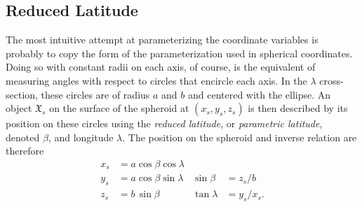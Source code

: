 \documentclass[11pt,dvipsnames]{thesis}
\begin{document}

\subsection{Reduced Latitude}
The most intuitive attempt at parameterizing the coordinate variables is probably to copy the form of the parameterization used in spherical coordinates. Doing so with constant radii on each axis, of course, is the equivalent of measuring angles with respect to circles that encircle each axis. In the $\lambda$ cross-section, these circles are of radius $a$ and $b$ and centered with the ellipse. An object $\mathfrak{X}_s$ on the surface of the spheroid at $(x_s, y_s, z_s)$ is then described by its position on these circles using the \textit{reduced latitude}, or \textit{parametric latitude}, denoted $\beta$, and longitude $\lambda$. The position on the spheroid and inverse relation are therefore
\begin{align}
x_s &= a \cos\beta \cos\lambda & & \\
y_s &= a \cos\beta \sin\lambda & \sin\beta &= z_s / b \\
z_s &= b \,\sin\beta & \tan\lambda &= y_s / x_s.
\end{align}
\end{document}
